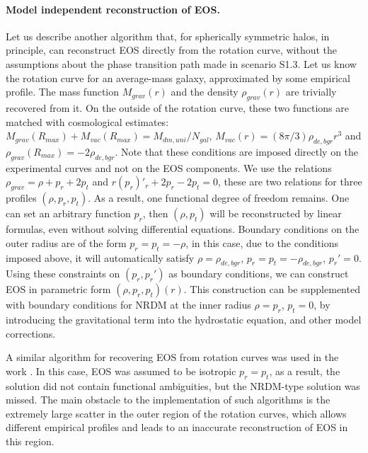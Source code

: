 \documentclass{article}
\begin{document}
\paragraph * {Model independent reconstruction of EOS.} Let us describe another algorithm that, for spherically symmetric halos, in principle, can reconstruct EOS directly from the rotation curve, without the assumptions about the phase transition path made in scenario S1.3. Let us know the rotation curve for an average-mass galaxy, approximated by some empirical profile. The mass function $ M_ {grav} (r) $ and the density $ \rho_ {grav} (r) $ are trivially recovered from it. On the outside of the rotation curve, these two functions are matched with cosmological estimates: $ M_ {grav} (R_ {max}) + M_ {vac} (R_ {max}) = M_ {dm, uni} / N_ {gal} $, $ M_ {vac} (r) = (8 \pi / 3) \rho_ {de, bgr} r ^ 3 $ and $ \rho_ {grav} (R_ {max}) = - 2 \rho_ {de, bgr} $. Note that these conditions are imposed directly on the experimental curves and not on the EOS components. We use the relations $ \rho_ {grav} = \rho + p_r + 2p_t $ and $ r (p_r) '_ r + 2p_r-2p_t = 0 $, these are two relations for three profiles $ (\rho, p_r, p_t) $. As a result, one functional degree of freedom remains. One can set an arbitrary function $ p_r $, then $ (\rho, p_t) $ will be reconstructed by linear formulas, even without solving differential equations. Boundary conditions on the outer radius are of the form $ p_r = p_t = - \rho $, in this case, due to the conditions imposed above, it will automatically satisfy $ \rho = \rho_ {de, bgr} $, $ p_r = p_t = - \rho_ {de, bgr } $, $ p_ {r} '= 0 $. Using these constraints on $ (p_r, p_ {r} ') $ as boundary conditions, we can construct EOS in parametric form $ (\rho, p_r, p_t) (r) $. This construction can be supplemented with boundary conditions for NRDM at the inner radius $ \rho = p_r $, $ p_t = 0 $, by introducing the gravitational term into the hydrostatic equation, and other model corrections.

A similar algorithm for recovering EOS from rotation curves was used in the work \cite {1301.6785}. In this case, EOS was assumed to be isotropic $ p_r = p_t $, as a result, the solution did not contain functional ambiguities, but the NRDM-type solution was missed. The main obstacle to the implementation of such algorithms is the extremely large scatter in the outer region of the rotation curves, which allows different empirical profiles and leads to an inaccurate reconstruction of EOS in this region.
\end{document}
